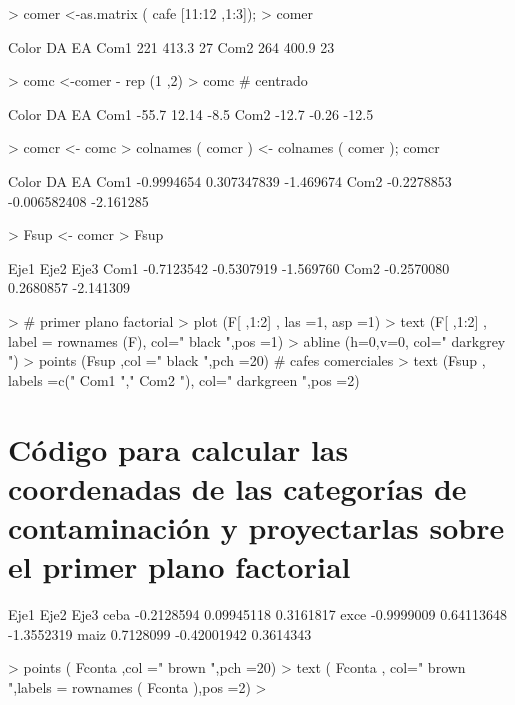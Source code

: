\documentclass{article}
\begin{document}
\begin{Schunk}
\begin{Sinput}
> comer <-as.matrix ( cafe [11:12 ,1:3]);
> comer
\end{Sinput}
\begin{Soutput}
     Color    DA EA
Com1   221 413.3 27
Com2   264 400.9 23
\end{Soutput}
\begin{Sinput}
> comc <-comer - rep (1 ,2) %*%t(g); 
> comc # centrado
\end{Sinput}
\begin{Soutput}
     Color    DA    EA
Com1 -55.7 12.14  -8.5
Com2 -12.7 -0.26 -12.5
\end{Soutput}
\begin{Sinput}
> comcr <- comc %*%solve ( Dsigma ) # reducido
> colnames ( comcr ) <- colnames ( comer ); comcr
\end{Sinput}
\begin{Soutput}
          Color           DA        EA
Com1 -0.9994654  0.307347839 -1.469674
Com2 -0.2278853 -0.006582408 -2.161285
\end{Soutput}
\begin{Sinput}
> Fsup <- comcr %*%U; 
> Fsup
\end{Sinput}
\begin{Soutput}
          Eje1       Eje2      Eje3 
Com1 -0.7123542 -0.5307919 -1.569760
Com2 -0.2570080  0.2680857 -2.141309
\end{Soutput}
\begin{Sinput}
> # primer plano factorial
> plot (F[ ,1:2] , las =1, asp =1)
> text (F[ ,1:2] , label = rownames (F), col=" black ",pos =1)
> abline (h=0,v=0, col=" darkgrey ")
> points (Fsup ,col =" black ",pch =20) # cafes comerciales
> text (Fsup , labels =c(" Com1 "," Com2 "), col=" darkgreen ",pos =2)
\end{Sinput}
\end{Schunk}

\section{Código para calcular las coordenadas de las categorías de contaminación y
proyectarlas sobre el primer plano factorial}

\begin{Schunk}
\begin{Soutput}
            Eje1        Eje2       Eje3 
 ceba  -0.2128594  0.09945118  0.3161817
 exce  -0.9999009  0.64113648 -1.3552319
 maiz   0.7128099 -0.42001942  0.3614343
\end{Soutput}
\begin{Sinput}
> points ( Fconta ,col =" brown ",pch =20)
> text ( Fconta , col=" brown ",labels = rownames ( Fconta ),pos =2)
> 
\end{Sinput}
\end{Schunk}
\end{document}
